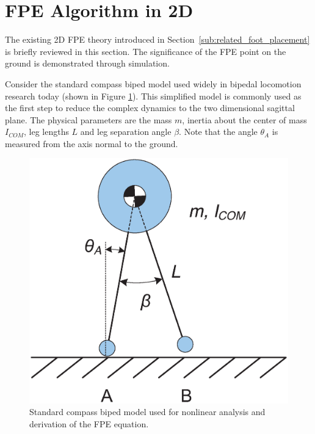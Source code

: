 


\section{FPE Algorithm in 2D} %
\label{sec:fpe_algorithm}
The existing 2D FPE theory introduced in Section~\ref{sub:related_foot_placement} is briefly reviewed in this section. The significance of the FPE point on the ground is demonstrated through simulation. 

Consider the standard compass biped model used widely in bipedal locomotion research today (shown in Figure \ref{fig:compass}). This simplified model is commonly used as the first step to reduce the complex dynamics to the two dimensional sagittal plane. The physical parameters are the mass $m$, inertia about the center of mass $I_{COM}$, leg lengths $L$ and leg separation angle $\beta$. Note that the angle $\theta_A$ is measured from the axis normal to the ground. 

\begin{figure}[!h]
	\centering
    \includegraphics[scale=0.4]{fig/fpe/fig1.eps}
  	\caption{Standard compass biped model used for nonlinear analysis  and derivation of the FPE equation.}
	\label{fig:compass}
\end{figure}

